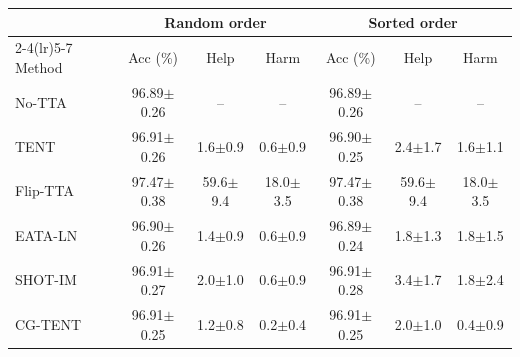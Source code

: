 \begin{tabular}{lcccccc}
\toprule
 & \multicolumn{3}{c}{Random order} & \multicolumn{3}{c}{Sorted order}\\
\cmidrule(lr){2-4}\cmidrule(lr){5-7}
Method & Acc (\%) & Help & Harm & Acc (\%) & Help & Harm\\
\midrule
No-TTA & 96.89$\pm$0.26 & -- & -- & 96.89$\pm$0.26 & -- & --\\
TENT & 96.91$\pm$0.26 & 1.6$\pm$0.9 & 0.6$\pm$0.9 & 96.90$\pm$0.25 & 2.4$\pm$1.7 & 1.6$\pm$1.1\\
Flip-TTA & 97.47$\pm$0.38 & 59.6$\pm$9.4 & 18.0$\pm$3.5 & 97.47$\pm$0.38 & 59.6$\pm$9.4 & 18.0$\pm$3.5\\
EATA-LN & 96.90$\pm$0.26 & 1.4$\pm$0.9 & 0.6$\pm$0.9 & 96.89$\pm$0.24 & 1.8$\pm$1.3 & 1.8$\pm$1.5\\
SHOT-IM & 96.91$\pm$0.27 & 2.0$\pm$1.0 & 0.6$\pm$0.9 & 96.91$\pm$0.28 & 3.4$\pm$1.7 & 1.8$\pm$2.4\\
\midrule
CG-TENT & 96.91$\pm$0.25 & 1.2$\pm$0.8 & 0.2$\pm$0.4 & 96.91$\pm$0.25 & 2.0$\pm$1.0 & 0.4$\pm$0.9\\
\bottomrule
\end{tabular}
